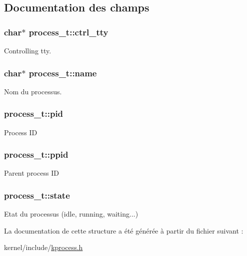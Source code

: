 \subsection{Documentation des champs}
\hypertarget{structprocess__t_a345124afd3f5f75fdc291d9076348950}{
\subsubsection[{ctrl\-\_\-tty}]{\setlength{\rightskip}{0pt plus 5cm}char$\ast$ process\-\_\-t\-::ctrl\-\_\-tty}}\label{structprocess__t_a345124afd3f5f75fdc291d9076348950}
Controlling tty. \hypertarget{structprocess__t_ab921f5e190c38325ac7ad805dd3d696e}{
\subsubsection[{name}]{\setlength{\rightskip}{0pt plus 5cm}char$\ast$ process\-\_\-t\-::name}}\label{structprocess__t_ab921f5e190c38325ac7ad805dd3d696e}
Nom du processus. \hypertarget{structprocess__t_accfb1a515727ba4c085e49166a302af0}{
\subsubsection[{pid}]{ process\-\_\-t\-::pid}}\label{structprocess__t_accfb1a515727ba4c085e49166a302af0}
Process I\-D \hypertarget{structprocess__t_a655d3aecbef82f263f36fab5685cddd0}{
\subsubsection[{ppid}]{ process\-\_\-t\-::ppid}}\label{structprocess__t_a655d3aecbef82f263f36fab5685cddd0}
Parent process I\-D \hypertarget{structprocess__t_a985ffe8e24460762cca611546422f8ea}{
\subsubsection[{state}]{ process\-\_\-t\-::state}}\label{structprocess__t_a985ffe8e24460762cca611546422f8ea}
Etat du processus (idle, running, waiting...) 

La documentation de cette structure a été générée à partir du fichier suivant \-:\begin{DoxyCompactItemize}
\item 
kernel/include/\hyperlink{kprocess_8h}{kprocess.\-h}\end{DoxyCompactItemize}
